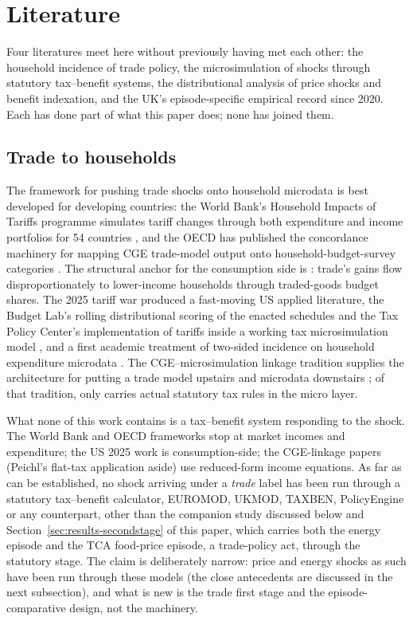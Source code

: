 \section{Literature}\label{sec:literature}

Four literatures meet here without previously having met each other:
the household incidence of trade policy, the microsimulation of shocks
through statutory tax--benefit systems, the distributional analysis of
price shocks and benefit indexation, and the UK's episode-specific
empirical record since 2020. Each has done part of what this paper
does; none has joined them.

\subsection{Trade to households}

The framework for pushing trade shocks onto household microdata is
best developed for developing countries: the World Bank's Household
Impacts of Tariffs programme simulates tariff changes through both
expenditure and income portfolios for 54 countries
\citep{artucporto2021, artucporto2019}, and the OECD has published the
concordance machinery for mapping CGE trade-model output onto
household-budget-survey categories \citep{luu2020}. The structural
anchor for the consumption side is \citet{fajgelbaumkhandelwal2016}:
trade's gains flow disproportionately to lower-income households through
traded-goods budget shares. The 2025 tariff war produced a fast-moving
US applied literature, the Budget Lab's rolling distributional scoring
of the enacted schedules and the Tax Policy Center's implementation of
tariffs inside a working tax microsimulation model
\citep{budgetlab2025, tpc2025}, and a first academic treatment of
two-sided incidence on household expenditure microdata
\citep{fleckpradhan2026}. The CGE--microsimulation linkage tradition
supplies the architecture for putting a trade model upstairs and
microdata downstairs \citep{robilliardrobinson2005, peichl2008,
colombo2010, cali2019}; of that tradition, only \citet{peichl2008}
carries actual statutory tax rules in the micro layer.

What none of this work contains is a tax--benefit system responding to
the shock. The World Bank and OECD frameworks stop at market incomes
and expenditure; the US 2025 work is consumption-side; the
CGE-linkage papers (Peichl's flat-tax application aside) use
reduced-form income equations. As far as can be established, no shock arriving under a \emph{trade}
label has been run through a statutory tax--benefit calculator, EUROMOD, UKMOD, TAXBEN, PolicyEngine or any counterpart, other than
the companion study discussed below and
Section~\ref{sec:results-secondstage} of this paper, which carries
both the energy episode and the TCA food-price episode, a
trade-policy act, through the statutory stage. The claim is
deliberately narrow: price and energy shocks as such have been run
through these models (the close antecedents are discussed in the next
subsection), and what is new is the trade first stage and the
episode-comparative design, not the machinery.

